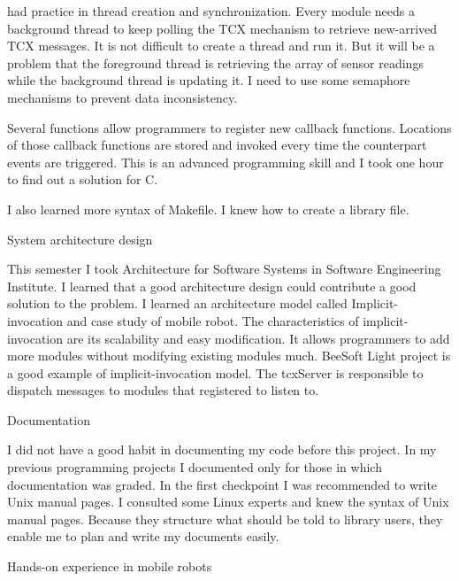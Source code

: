 {had practice in thread creation and synchronization. Every module
needs a background thread to keep polling the TCX mechanism to
retrieve new-arrived TCX messages. It is not difficult to create a
thread and run it. But it will be a problem that the foreground thread
is retrieving the array of sensor readings while the background thread
is updating it. I need to use some semaphore mechanisms to prevent
data inconsistency.\par \par Several functions allow programmers to
register new callback functions. Locations of those callback functions
are stored and invoked every time the counterpart events are
triggered. This is an advanced programming skill and I took one hour
to find out a solution for C.\par \par I also learned more syntax of
Makefile. I knew how to create a library file. \par
\begin{itemize}{\bf \item System architecture design}
  \end{itemize}\par This semester I took Architecture for Software
Systems in Software Engineering Institute. I learned that a good
architecture design could contribute a good solution to the problem. I
learned an architecture model called Implicit-invocation and case
study of mobile robot. The characteristics of implicit-invocation are
its scalability and easy modification. It allows programmers to add
more modules without modifying existing modules much. BeeSoft Light
project is a good example of implicit-invocation model. The tcxServer
is responsible to dispatch messages to modules that registered to
listen to.\par \begin{itemize}{\bf \item Documentation}
  \end{itemize}\par I did not have a good habit in documenting my
code before this project. In my previous programming projects I
documented only for those in which documentation was graded. In the
first checkpoint I was recommended to write Unix manual pages. I
consulted some Linux experts and knew the syntax of Unix manual pages.
Because they structure what should be told to library users, they
enable me to plan and write my documents easily.\par
\begin{itemize}{\bf \item Hands-on experience in mobile robots}

\end{itemize}}

